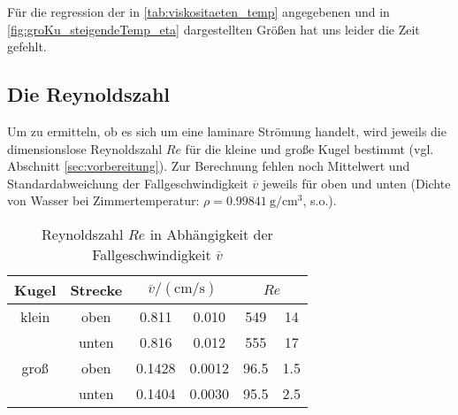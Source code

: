 %

Für die regression der in \ref{tab:viskositaeten_temp} angegebenen und in \ref{fig:groKu_steigendeTemp_eta} dargestellten Größen
hat uns leider die Zeit gefehlt. 

\subsection[]{Die Reynoldszahl}
Um zu ermitteln, ob es sich um eine laminare Strömung handelt, wird jeweils die dimensionslose Reynoldszahl $Re$ für die kleine und große Kugel bestimmt
(vgl. Abschnitt \ref{sec:vorbereitung}).
Zur Berechnung fehlen noch Mittelwert und Standardabweichung der Fallgeschwindigkeit $\overline{v}$ jeweils für oben und unten
(Dichte von Wasser bei Zimmertemperatur: $\rho = \qty{0.99841}{\g \per \cm^3}$, s.o.).

\begin{table}
    \caption[]{Reynoldszahl $Re$ in Abhängigkeit der Fallgeschwindigkeit $\overline{v}$}
    \label{tab:reynold}
    \centering
    \begin{tabular}[]{S S S[table-format=1.4] @{${}\pm{}$} S[table-format=1.4] S[table-format=4.1] @{${}\pm{}$} S[table-format=3.1]}
        \toprule
        {Kugel} & {Strecke} &  &  \\
        \bottomrule
        {klein} & {oben} & 0.811 & 0.010 & 549 & 14 \\
         & {unten} & 0.816 & 0.012 & 555 & 17 \\
        {groß} & {oben} & 0.1428 & 0.0012 & 96.5 & 1.5 \\
         & {unten} & 0.1404 & 0.0030 & 95.5 & 2.5 \\
    \end{tabular}
\end{table}


